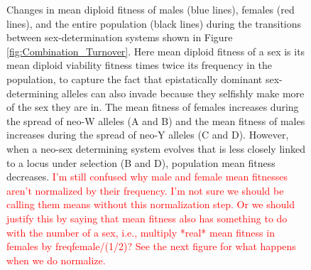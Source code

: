 \documentclass[12pt]{article}
\begin{document}
\begin{figure}[!h]
\centering
{}
\caption{
Changes in mean diploid fitness of males (blue lines), females (red lines), and the entire population (black lines) during the transitions between sex-determination systems shown in Figure \ref{fig:Combination_Turnover}. 
Here mean diploid fitness of a sex is its mean diploid viability fitness times twice its frequency in the population, to capture the fact that epistatically dominant sex-determining alleles can also invade because they selfishly make more of the sex they are in. 
The mean fitness of females increases during the spread of neo-W alleles (A and B) and the mean fitness of males increases during the spread of neo-Y alleles (C and D). 
However, when a neo-sex determining system evolves that is less closely linked to a locus under selection (B and D), population mean fitness decreases. 
\textcolor{red}{I'm still confused why male and female mean fitnesses aren't normalized by their frequency. I'm not sure we should be calling them means without this normalization step. Or we should justify this by saying that mean fitness also has something to do with the number of a sex, i.e., multiply *real* mean fitness in females by freqfemale/(1/2)? See the next figure for what happens when we do normalize.}
}
\label{fig:Combination_MeanFit}
\end{figure}
\newpage
\end{document}
